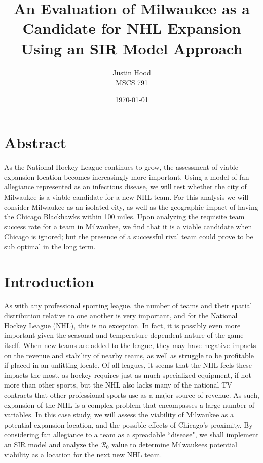 \documentclass[11pt]{report}            %
\title{\bf An Evaluation of Milwaukee as a Candidate for NHL Expansion\\
\large Using an SIR Model Approach}  %
\author{Justin Hood\\
MSCS 791}              %
\date{\today}                           %
\newcommand{\ro}{\mathcal{R}_0}
\begin{document}
\maketitle                              %
\setcounter{page}{2}                    %
\tableofcontents                        %
\newpage
\section*{Abstract}
As the National Hockey League continues to grow, the assessment of viable expansion location becomes increasingly more important. Using a model of fan allegiance represented as an infectious disease, we will test whether the city of Milwaukee is a viable candidate for a new NHL team. For this analysis we will consider Milwaukee as an isolated city, as well as the geographic impact of having the Chicago Blackhawks within 100 miles. Upon analyzing the requisite team success rate for a team in Milwaukee, we find that it is a viable candidate when Chicago is ignored; but the presence of a successful rival team could prove to be sub optimal in the long term.
\section*{Introduction}                %
As with any professional sporting league, the number of teams and their spatial distribution relative to one another is very important, and for the National Hockey League (NHL), this is no exception. In fact, it is possibly even more important given the seasonal and temperature dependent nature of the game itself. When new teams are added to the league, they may have negative impacts on the revenue and stability of nearby teams, as well as struggle to be profitable if placed in an unfitting locale. Of all leagues, it seems that the NHL feels these impacts the most, as hockey requires just as much specialized equipment, if not more than other sports, but the NHL also lacks many of the national TV contracts that other professional sports use as a major source of revenue\cite{light}. As such, expansion of the NHL is a complex problem that encompasses a large number of variables. In this case study, we will assess the viability of Milwaukee as a potential expansion location, and the possible effects of Chicago's proximity. By considering fan allegiance to a team as a spreadable ``disease", we shall implement an SIR model and analyze the $\ro$ value to determine Milwaukees potential viability as a location for the next new NHL team.
\end{document}
